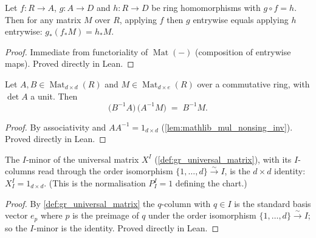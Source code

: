 \begin{lemma}

  \label{lem:gr_map_map_eq_of_comp}
  Let \(f : R \to A\), \(g : A \to D\) and \(h : R \to D\) be ring
  homomorphisms with \(g \circ f = h\). Then for any matrix \(M\) over \(R\),
  applying \(f\) then \(g\) entrywise equals applying \(h\) entrywise:
  \(g_\ast(f_\ast M) = h_\ast M\).
\end{lemma}
\begin{proof}

\leanok
  Immediate from functoriality of \(\operatorname{Mat}(-)\) (composition of
  entrywise maps). Proved directly in Lean.
\end{proof}

\begin{lemma}

  \label{lem:gr_inv_mul_inv_mul_cancel}
  Let \(A, B \in \operatorname{Mat}_{d\times d}(R)\) and
  \(M \in \operatorname{Mat}_{d\times e}(R)\) over a commutative ring, with
  \(\det A\) a unit. Then
  \[
    \bigl(B^{-1} A\bigr)\,\bigl(A^{-1} M\bigr) \;=\; B^{-1} M.
  \]
\end{lemma}
\begin{proof}

\leanok
  By associativity and \(A A^{-1} = 1_{d\times d}\)
  (\cref{lem:mathlib_mul_nonsing_inv}). Proved directly in Lean.
\end{proof}

\begin{lemma}

  \label{lem:gr_universalMatrix_submatrix_self}
  The \(I\)-minor of the universal matrix \(X^I\)
  (\cref{def:gr_universal_matrix}), with its \(I\)-columns read through the order
  isomorphism \(\{1,\dots,d\} \xrightarrow{\sim} I\), is the \(d\times d\)
  identity: \(X^I_I = 1_{d\times d}\). (This is the normalisation \(P^I_I = 1\)
  defining the chart.)
\end{lemma}
\begin{proof}

\leanok
  By \cref{def:gr_universal_matrix} the \(q\)-column with \(q \in I\) is the
  standard basis vector \(e_p\) where \(p\) is the preimage of \(q\) under the
  order isomorphism \(\{1,\dots,d\} \xrightarrow{\sim} I\); so the \(I\)-minor
  is the identity. Proved directly in Lean.
\end{proof}

